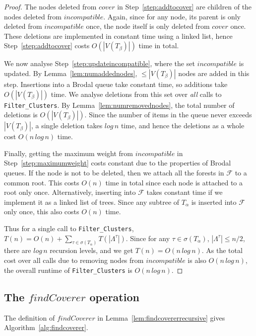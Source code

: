 \documentclass[final,1p,times]{elsarticle}
\newcommand{\leafset}{\Lambda}
\newcommand{\TA}{T_\alpha}
\newcommand{\TB}{T_\beta}
\begin{document}
\begin{proof}
            The nodes deleted from $cover$ in Step~\ref{step:addtocover} are children of the nodes deleted from $incompatible$. Again, since for any node, its parent is only deleted from $incompatible$ once, the node itself is only deleted from $cover$ once. These deletions are implemented in constant time using a linked list, hence Step~\ref{step:addtocover} costs $O(|V(\TB)|)$ time in total.

            We now analyse Step~\ref{step:updateincompatible}, where the set $incompatible$ is updated. By Lemma~\ref{lem:numaddednodes}, $\leq |V(\TB)|$ nodes are added in this step. Insertions into a Brodal queue take constant time, so additions take $O(|V(\TB)|)$ time. We analyse deletions from this set over \textit{all} calls to \texttt{Filter\_Clusters}. By Lemma~\ref{lem:numremovednodes}, the total number of deletions is $O(|V(\TB)|)$. Since the number of items in the queue never exceeds $|V(\TB)|$, a single deletion takes $log\,n$ time, and hence the deletions as a whole cost $O(n\,log\,n)$ time.

            Finally, getting the maximum weight from $incompatible$ in Step~\ref{step:maximumweight} costs constant due to the properties of Brodal queues. If the node is not to be deleted, then we attach all the forests in $\mathcal{F}$ to a common root. This costs $O(n)$ time in total since each node is attached to a root only once. Alternatively, inserting into $\mathcal{F}$ takes constant time if we implement it as a linked list of trees. Since any subtree of $\TA$ is inserted into $\mathcal{F}$ only once, this also costs $O(n)$ time.

            Thus for a single call to \texttt{Filter\_Clusters}, $T(n) = O(n) + \sum_{\tau \in \sigma(\TA)} T(|\leafset^{\tau}|)$. Since for any $\tau \in \sigma(\TA)$, $|\leafset^{\tau}| \leq n/2$, there are $log\,n$ recursion levels, and we get $T(n) = O(n\,log\,n)$. As the total cost over all calls due to removing nodes from $incompatible$ is also $O(n\,log\,n)$, the overall runtime of \texttt{Filter\_Clusters} is $O(n\,log\,n)$.
        \end{proof}

    \subsection{The $findCoverer$ operation}
    \label{subsec:findcoverer}

    The definition of $findCoverer$ in Lemma~\ref{lem:findcovererrecursive} gives Algorithm~\ref{alg:findcoverer}.
\end{document}
